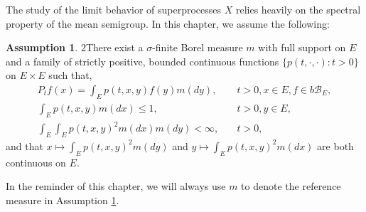 \documentclass[UTF8]{pkuthss}
\theoremstyle{plain}
\theoremstyle{definition}
\newtheorem{asp}{Assumption}[chapter]
\numberwithin{equation}{section}
\begin{document}
	The study of the limit behavior of superprocesses $X$
		relies heavily on the spectral property of the mean semigroup.
 In this chapter, we assume the following:
\begin{asp}{$2$}\label{asp:2}
	There exist a $\sigma$-finite Borel measure $m$ with full support on $E$ and a family of strictly positive, bounded continuous functions $\{ p(t,\cdot,\cdot): t > 0 \}$ on $E \times E$ such that,
\begin{align}
	P_t f(x)
	= \int_E p(t,x,y) f(y) m(dy),
	&\quad t>0, x \in E,f \in b\mathscr B_E,\label{eq:kernMeanSemGroup}
	\\ \int_E p(t,x,y)m(dx)
	\leq 1,
	&\quad t>0,y\in E,\label{eq:kernMeanSemGroup2}
	\\ \int_E \int_E p(t,x,y)^2 m(dx) m(dy)
	<\infty,
	&\quad t> 0,\label{eq:kernMeanSemGroup3}
\end{align}
	and that $x \mapsto \int_E p(t,x,y)^2 m(dy)$ and $y \mapsto \int_E p(t,x,y)^2 m(dx)$ are both continuous on $E$.
\end{asp}

	In the reminder of this chapter, we will always use $m$ to denote the reference measure in Assumption \ref{asp:2}.
\end{document}
